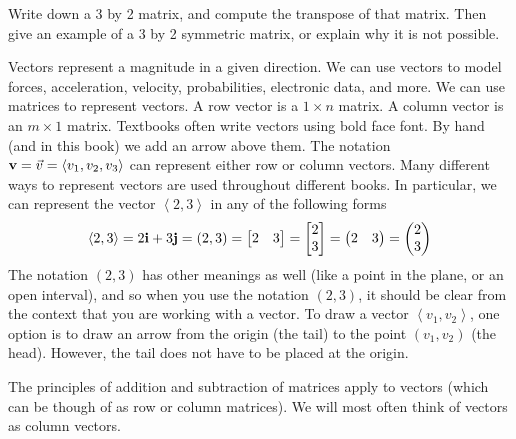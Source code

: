 \begin{problem}
 Write down a 3 by 2 matrix, and compute the transpose of that matrix. Then give an example of a 3 by 2 symmetric matrix, or explain why it is not possible.
\end{problem}



Vectors represent a magnitude in a given direction. We can use vectors to model forces, acceleration, velocity, probabilities, electronic data, and more. We can use matrices to represent vectors. A row vector is a {$1\times n$} matrix. A column vector is an {$m \times 1$} matrix.   Textbooks often write vectors using bold face font. By hand (and in this book) we add an arrow above them. The notation ${\bf v} = \vec v = \left<v_1,v_2,v_3\right>$ can represent either row or column vectors. Many different ways to represent vectors are used throughout different books.  In particular, we can represent the vector $\left<2,3\right>$ in any of the following forms
$$\left<2,3\right>
= 2{\bf i}+3{\bf j} 
= (2,3) 
= \begin{bmatrix}2&3\end{bmatrix} 
= \begin{bmatrix}2\\3\end{bmatrix}
= \begin{pmatrix}2&3\end{pmatrix} 
= \begin{pmatrix}2\\3\end{pmatrix}
$$ 
The notation $(2,3)$ has other meanings as well (like a point in the plane, or an open interval), and so when you use the notation $(2,3)$, it should be clear from the context that you are working with a vector. 
{}To draw a vector $\left<v_1,v_2\right>$, one option is to draw an arrow from the origin (the tail) to the point $(v_1,v_2)$ (the head). 
However, the tail does not have to be placed at the origin. 

The principles of addition and subtraction of matrices apply to vectors (which can be though of as row or column matrices). We will most often think of vectors as column vectors. 

